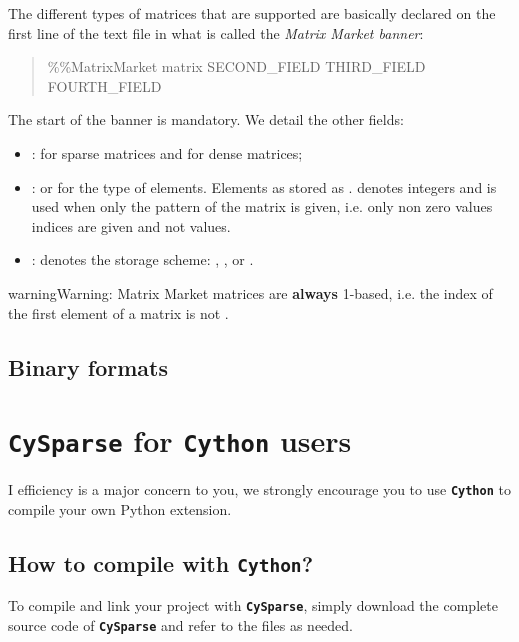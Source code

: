 \documentclass[letterpaper,10pt,english]{sphinxmanual}
\begin{document}
The different types of matrices that are supported are basically declared on the first line of the text file in what is called the \emph{Matrix Market banner}:
\begin{quote}

\%\%MatrixMarket matrix SECOND\_FIELD THIRD\_FIELD FOURTH\_FIELD
\end{quote}

The start of the banner  is mandatory. We detail the other fields:
\begin{itemize}
\item {} 
:  for sparse matrices and  for dense matrices;

\item {} 
:  or  for the type of elements. Elements as stored as .  denotes integers and  is used
when only the pattern of the matrix is given, i.e. only non zero values indices are given and not values.

\item {} 
: denotes the storage scheme: , ,  or .

\end{itemize}

\begin{notice}{warning}{Warning:}
Matrix Market matrices are \textbf{always} 1-based, i.e. the index of the first element of a matrix is  not .
\end{notice}


\section{Binary formats}
\label{io_formats:binary-formats}

\chapter{\textbf{\texttt{CySparse}} for \textbf{\texttt{Cython}} users}
\label{cysparse_cython_users::doc}\label{cysparse_cython_users:cysparse-for-cython-users}
I efficiency is a major concern to you, we strongly encourage you to use \textbf{\texttt{Cython}} to
compile your own Python extension.


\section{How to compile with \textbf{\texttt{Cython}}?}
\label{cysparse_cython_users:how-to-compile-with-cython}
To compile and link your project with \textbf{\texttt{CySparse}}, simply download the complete source code of \textbf{\texttt{CySparse}} and refer to the  files as needed.
\end{document}
